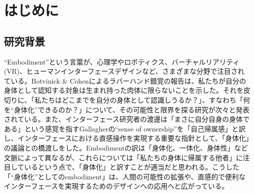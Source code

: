\chapter{はじめに}
\label{introduction}

\section{研究背景}
\label{subject}
``Embodiment''という言葉が、心理学やロボティクス、バーチャルリアリティ(VR)、ヒューマンインターフェースデザインなど、さまざまな分野で注目されている。Botvinick \& Cohenによるラバーハンド錯覚\cite{BotvinickCohen1998}の報告は、私たちが自分の身体として認知する対象は生まれ持った肉体に限らないことを示した。それを皮切りに、「私たちはどこまでを自分の身体として認識しうるか？」、すなわち「何を``身体化''できるのか？」について、その可能性と限界を探る研究が次々と発表されている。また、インターフェース研究者の渡邊は「まさに自分自身の身体である」という感覚を指すGallagher\cite{Gallagher2000}の``sense of ownership''を「自己帰属感」と訳し\cite{Watanabe2013}、インターフェースにおける直感操作を実現する重要な指針として、「身体化」の議論との橋渡しをした。Embodimentの訳は「身体化、一体化、身体性」など文脈によって異なるが、これらについては「私たちの身体に帰属する他者」に注目しているという点で、「身体化」と訳すことが適当だと思われる。こうした「``身体化''としてのembodiment」は、人間の可能性の拡張や、直感的で便利なインターフェースを実現するためのデザインへの応用へと広がっている。





